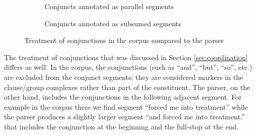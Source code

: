     \begin{figure}[!ht]
        \centering
        \begin{subfigure}[b]{0.47\textwidth}
            \centering
            \caption{Conjuncts annotated as parallel segments}
            \label{fig:segment-conjunction-paralel}
        \end{subfigure}
        \quad
        \begin{subfigure}[b]{0.47\textwidth}
            \centering
            \caption{Conjuncts annotated as subsumed segments}
            \label{fig:segment-conjunction-subsumed}
        \end{subfigure}
        \caption{Treatment of conjunctions in the corpus compared to the parser}
        \label{fig:conjunction-treatment}
    \end{figure}
    
    The treatment of conjunctions that was discussed in Section \ref{sec:coordination} differs as well. In the corpus, the conjunctions (such as ``and'', ``but'', ``so'', etc.) are excluded from the conjunct segments; they are considered markers in the clause/group complexes rather than part of the constituent. The parser, on the other hand, includes the conjunctions in the following adjacent segment. For example in the corpus there we find segment ``forced me into treatment'' while the parser produces a slightly larger segment ``and forced me into treatment.'' that includes the conjunction at the beginning and the full-stop at the end.
    
